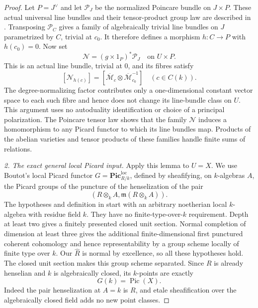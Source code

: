 \begin{proof}
Let $P=J^\vee$ and let $\mathcal P_J$ be the
normalized Poincare bundle on $J\times P$.
These actual universal line bundles and their
tensor-product group law are described in
\citet[Sections 9--10, especially the universal
property on p.~16]{D_MilneAbelian2022}.
Transposing $\mathcal P_C$ gives a family of
algebraically trivial line bundles on $J$
parametrized by $C$, trivial at $c_0$. It therefore
defines a morphism $h:C\to P$ with $h(c_0)=0$.
Now set
\[
             \mathcal N=(g\times1_P)^*\mathcal P_J
                    \quad\text{on }U\times P.
\]
This is an actual line bundle, trivial at $0$,
and its fibres satisfy
\begin{equation}\label{eq:C3-dual-Jacobian-family}
       [\mathcal N_{h(c)}]
        =[\overline{\mathcal M}_{c}\otimes
                     \overline{\mathcal M}_{c_0}^{-1}]
                    \quad(c\in C(k)).
\end{equation}
The degree-normalizing factor contributes only
a one-dimensional constant vector space to each
such fibre and hence does not change its line-bundle
class on $U$. This argument uses no autoduality
identification or choice of a principal polarization.
The Poincare tensor law shows that the family
$\mathcal N$ induces a homomorphism to any Picard
functor to which its line bundles map. Products
of the abelian varieties and tensor products
of these families handle finite sums of relations.

\emph{2. The exact general local Picard input.}
Apply this lemma to $U=X$. We use Boutot's local
Picard functor $G=\mathbf{Pic}^{\mathrm{loc}}_{R/k}$,
defined by sheafifying, on $k$-algebras $A$, the
Picard groups of the puncture of the henselization
of the pair
\[
                  (R\otimes_k A,\mathfrak m(R\otimes_k A)).
\]
The hypotheses and definition in
\citet[Introduction, Theorem 1(i)--(ii) and the
following paragraph, p.~VII]{D_Boutot1978}
start with an arbitrary noetherian local
$k$-algebra with residue field $k$.
They have no finite-type-over-$k$ requirement.
Depth at least two gives a finitely presented
closed unit section. Normal completion of
dimension at least three gives the additional
finite-dimensional first punctured coherent
cohomology and hence representability by a
group scheme locally of finite type over $k$.
Our $\widehat R$ is normal by excellence, so
all these hypotheses hold. The closed unit
section makes this group scheme separated.
Since $R$ is already henselian and $k$ is
algebraically closed, its $k$-points are exactly
\[
                         G(k)=\operatorname{Pic}(X).
\]
Indeed the pair henselization at $A=k$ is $R$,
and etale sheafification over the algebraically
closed field adds no new point classes.


\end{proof}
